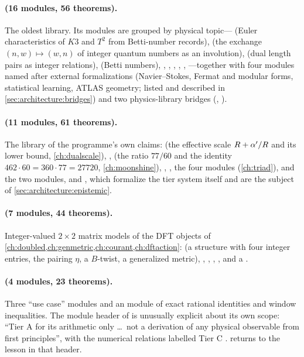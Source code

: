 \paragraph{ (16 modules, 56 theorems).} The oldest library.
Its modules are grouped by physical topic--- (Euler characteristics of
$K3$ and $T^2$ from Betti-number records),  (the exchange
$(n,w)\mapsto(w,n)$ of integer quantum numbers as an involution), 
(dual length pairs as integer relations),  (Betti numbers),
, , , ,
, ---together with four modules named after
external formalizations (Navier--Stokes, Fermat and modular forms, statistical learning,
ATLAS geometry; listed and described in \cref{sec:architecture:bridges}) and two
physics-library bridges (, ).

\paragraph{ (11 modules, 61 theorems).} The library of the
programme's own claims:  (the effective scale
$R+\alpha'/R$ and its lower bound, \cref{ch:dualscale}), ,
 (the ratio $77/60$ and the identity $462\cdot60=360\cdot77=27720$,
\cref{ch:moonshine}), , , the
four  modules (\cref{ch:triad}), and the two  modules,
 and , which formalize the tier system itself and are the subject
of \cref{sec:architecture:epistemic}.

\paragraph{ (7 modules, 44 theorems).} Integer-valued
$2\times2$ matrix models of the DFT objects of \cref{ch:doubled,ch:genmetric,ch:courant,ch:dftaction}:
 (a structure  with four integer entries, the pairing
$\eta$, a $B$-twist, a generalized metric), , ,
, ,  and a .

\paragraph{ (4 modules, 23 theorems).} Three ``use case''
modules and an  module of exact rational identities and window
inequalities. The module header of  is unusually explicit about its own
scope: ``Tier A for its arithmetic only \ldots\ not a derivation of any physical observable
from first principles'', with the numerical relations labelled Tier C
.  returns to the
lesson in that header.

